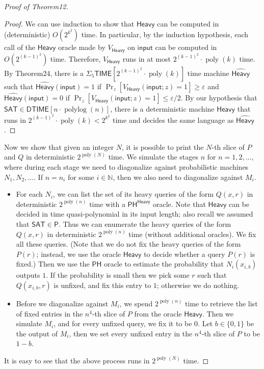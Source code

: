 \documentclass[10pt,a4paper]{article}
\begin{document}
\begin{proof}[Proof of Theorem12]
\begin{proof}
We can use induction to show that $\mathsf{Heavy}$ can be computed in (deterministic) $O(2^{k^2})$ time. In particular, by the induction hypothesis, each call of the $\mathsf{Heavy}$ oracle made by $V_{\mathsf{Heavy}}$ on $\mathsf{input}$ can be computed in $O(2^{(k-1)^2})$ time. Therefore, $V_{\mathsf{Heavy}}$ runs in at most $2^{(k-1)^2}\cdot\operatorname{poly}(k)$ time. By Theorem24, there is a $\Sigma_5\mathsf{TIME}[2^{(k-1)^2}\cdot\operatorname{poly}(k)]$ time machine $\widehat{\mathsf{Heavy}}$ such that $\widehat{\mathsf{Heavy}}(\mathsf{input})=1$ if $\Pr_z[V_{\mathsf{Heavy}}(\mathsf{input};z)=1]\geq\varepsilon$ and $\widehat{\mathsf{Heavy}}(\mathsf{input})=0$ if $\Pr_z[V_{\mathsf{Heavy}}(\mathsf{input};z)=1]\leq\varepsilon/2$. By our hypothesis that $\mathsf{SAT}\in\mathsf{DTIME}[n\cdot\operatorname{polylog}(n)]$, there is a deterministic machine $\mathsf{Heavy}$ that runs in $2^{(k-1)^2}\cdot\operatorname{poly}(k)<2^{k^2}$ time and decides the same language as $\widehat{\mathsf{Heavy}}$.
\end{proof}
Now we show that given an integer $N$, it is possible to print the $N$-th slice of $P$ and $Q$ in deterministic $2^{\operatorname{poly}(N)}$ time. We simulate the stages $n$ for $n=1,2,\ldots$, where during each stage we need to diagonalize against probabilistic machines $N_1,N_2,\ldots$. If $n=n_i$ for some $i\in\mathbb N$, then we also need to diagonalize against $M_i$.
\begin{itemize}
\item For each $N_i$, we can list the set of its heavy queries of the form $Q(x,r)$ in deterministic $2^{\operatorname{poly}(n)}$ time with a $\mathsf{PH}^{\mathsf{Heavy}}$ oracle. Note that $\mathsf{Heavy}$ can be decided in time quasi-polynomial in its input length; also recall we assumed that $\mathsf{SAT}\in\mathsf P$. Thus we can enumerate the heavy queries of the form $Q(x,r)$ in deterministic $2^{\operatorname{poly}(n)}$ time (without additional oracles). We fix all these queries. (Note that we do not fix the heavy queries of the form $P(r)$; instead, we use the oracle $\mathsf{Heavy}$ to decide whether a query $P(r)$ is fixed.) Then we use the $\mathsf{PH}$ oracle to estimate the probability that $N_i(x_{i,b})$ outputs $1$. If the probability is small then we pick some $r$ such that $Q(x_{i,b},r)$ is unfixed, and fix this entry to $1$; otherwise we do nothing.
\item Before we diagonalize against $M_i$, we spend $2^{\operatorname{poly}(n)}$ time to retrieve the list of fixed entries in the $n^4$-th slice of $P$ from the oracle $\mathsf{Heavy}$. Then we simulate $M_i$, and for every unfixed query, we fix it to be $0$. Let $b\in\{0,1\}$ be the output of $M_i$, then we set every unfixed entry in the $n^4$-th slice of $P$ to be $1-b$.
\end{itemize}
It is easy to see that the above process runs in $2^{\operatorname{poly}(N)}$ time.
\end{proof}
\end{document}
